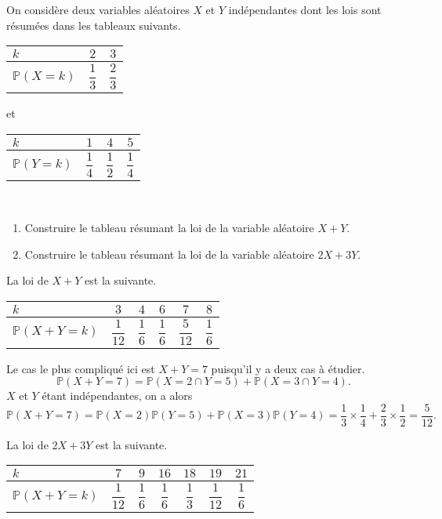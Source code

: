 \documentclass[11pt,fleqn, openany]{book} %
\begin{document}
\begin{exercise}On considère deux variables aléatoires $X$ et $Y$ indépendantes dont les lois sont résumées dans les tableaux suivants.
\vskip10pt
\renewcommand{\arraystretch}{2.2}
\hfill
\begin{tabular}{|l|c|c|}
\hline
$k$ & $2$& $3$  \\
\hline
$\mathbb{P}(X=k)$ & $\dfrac{1}{3}$ & $\dfrac{2}{3}$ \\
\hline \end{tabular}
\hfill et \hfill
\begin{tabular}{|l|c|c|c|}
\hline
$k$ & $1$& $4$ & $5$ \\
\hline
$\mathbb{P}(Y=k)$ & $\dfrac{1}{4}$ & $\dfrac{1}{2}$ & $\dfrac{1}{4}$ \\
\hline \end{tabular}\hfill~
\vskip10pt
\begin{enumerate}
\item Construire le tableau résumant la loi de la variable aléatoire $X+Y$.
\item Construire le tableau résumant la loi de la variable aléatoire $2X+3Y$.
\end{enumerate}\end{exercise}

\begin{solution}La loi de $X+Y$ est la suivante.
\begin{center}
\renewcommand{\arraystretch}{2.2}
\begin{tabular}{|l|c|c|c|c|c|}
\hline
$k$ & $3$& $4$ & $6$ & $7$ & $8$  \\
\hline
$\mathbb{P}(X+Y=k)$ & $\dfrac{1}{12}$ & $\dfrac{1}{6}$ & $\dfrac{1}{6}$ & $\dfrac{5}{12}$ & $\dfrac{1}{6}$\\
\hline \end{tabular}\end{center}

Le cas le plus compliqué ici est $X+Y=7$ puisqu'il y a deux cas à étudier. 
\[\mathbb{P}(X+Y=7)=\mathbb{P}(X=2 \cap Y=5)+\mathbb{P}(X=3 \cap Y=4).\]
$X$ et $Y$ étant indépendantes, on a alors
\[\mathbb{P}(X+Y=7)=\mathbb{P}(X=2)\mathbb{P}(Y=5)+\mathbb{P}(X=3)\mathbb{P}( Y=4)=\dfrac{1}{3} \times \dfrac{1}{4}+ \dfrac{2}{3} \times \dfrac{1}{2}=\dfrac{5}{12}.\]

La loi de $2X+3Y$ est la suivante.

\begin{center}
\renewcommand{\arraystretch}{2.2}
\begin{tabular}{|l|c|c|c|c|c|c|}
\hline
$k$ & $7$& $9$ & $16$ & $18$ & $19$ & $21$  \\
\hline
$\mathbb{P}(X+Y=k)$ & $\dfrac{1}{12}$ & $\dfrac{1}{6}$ & $\dfrac{1}{6}$ & $\dfrac{1}{3}$ & $\dfrac{1}{12}$ & $\dfrac{1}{6}$\\
\hline \end{tabular}\end{center}\end{solution}
\end{document}
